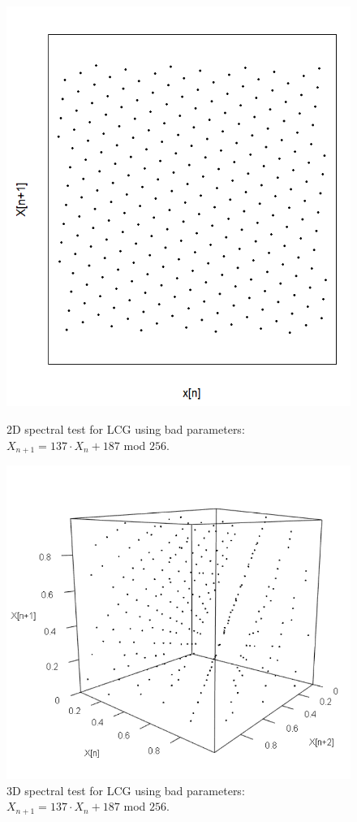 \begin{figure}
	\centering
	\begin{minipage}{0.45\textwidth}
		\centering
		\includegraphics[width=\linewidth]{billder/spec_bad_lcg_2d.png}
		\caption{2D spectral test for LCG using bad parameters: $X_{n+1}=137\cdot X_{n}+187$ mod $256$.}
		\label{fig:badspec2d}
	\end{minipage}\hfill
	\begin{minipage}{0.45\textwidth}
		\centering
		\includegraphics[width=\linewidth]{billder/spec_bad_lcg_3d.png}
		\caption{3D spectral test for LCG using bad parameters: $X_{n+1}=137\cdot X_{n}+187$ mod $256$.}
		\label{fig:badspec3d}
	\end{minipage}
\end{figure}

